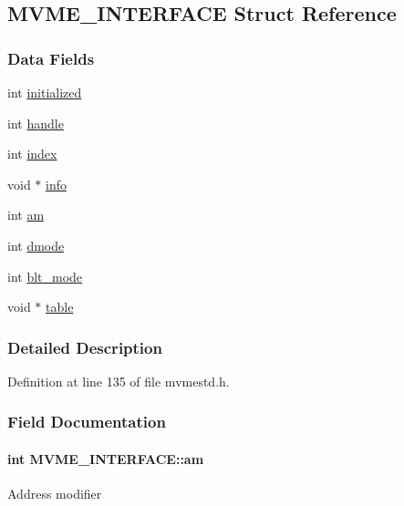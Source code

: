 \subsection{MVME\_\-INTERFACE Struct Reference}
\label{structMVME__INTERFACE}
\subsubsection*{Data Fields}
\begin{DoxyCompactItemize}
\item 
int \hyperlink{structMVME__INTERFACE_a594b981e168e22b18145e20147b48707}{initialized}
\item 
int \hyperlink{structMVME__INTERFACE_a645e42193b88548a3148730b05b67c46}{handle}
\item 
int \hyperlink{structMVME__INTERFACE_a474a77416b39c0ae244a29cf6055a9ac}{index}
\item 
void $\ast$ \hyperlink{structMVME__INTERFACE_a7fb4fc35204b1adc988c92ead0521b29}{info}
\item 
int \hyperlink{structMVME__INTERFACE_ae724d5036b93b3891c63e2c5a9e18834}{am}
\item 
int \hyperlink{structMVME__INTERFACE_a229c5c54af3c138b88d219590c38cfe2}{dmode}
\item 
int \hyperlink{structMVME__INTERFACE_a3c4ed00734831ccec46d8ff73d98caea}{blt\_\-mode}
\item 
void $\ast$ \hyperlink{structMVME__INTERFACE_a5af88063fb0f01dfcfd8438a2cd2a0f0}{table}
\end{DoxyCompactItemize}


\subsubsection{Detailed Description}


Definition at line 135 of file mvmestd.h.

\subsubsection{Field Documentation}
\paragraph[{am}]{\setlength{\rightskip}{0pt plus 5cm}int {\bf MVME\_\-INTERFACE::am}}\hfill\label{structMVME__INTERFACE_ae724d5036b93b3891c63e2c5a9e18834}
Address modifier 

